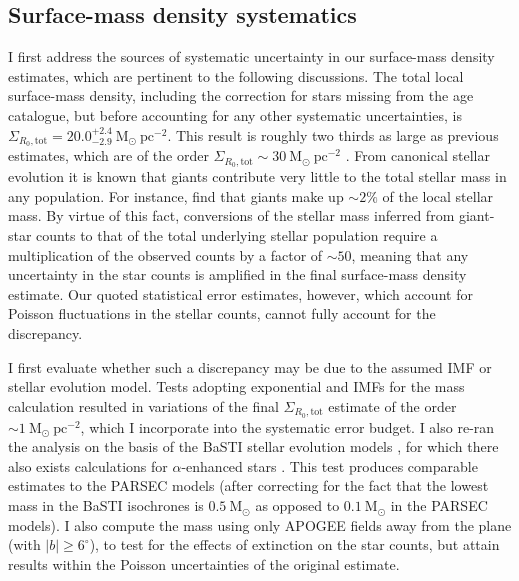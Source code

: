 \subsection{Surface-mass density systematics}
\label{sec:discrepant}
I first address the sources of systematic uncertainty in our surface-mass density estimates, which are pertinent to the following discussions. The total local surface-mass density, including the correction for stars missing from the age catalogue, but before accounting for any other systematic uncertainties, is $\Sigma_{R_0, \text{tot}} = 20.0_{-2.9}^{+2.4}\ \mathrm{M_{\odot} \ pc^{-2}}$. This result is roughly two thirds as large as previous estimates, which are of the order $\Sigma_{R_0, \text{tot}} \sim 30\ \mathrm{M_{\odot} \ pc^{-2}}$ \citep[e.g.][]{2006MNRAS.372.1149F,2012ApJ...751..131B,2015ApJ...814...13M}. From canonical stellar evolution it is known that giants contribute very little to the total stellar mass in any population. For instance, \citet{2015ApJ...814...13M} find that giants make up $\sim 2\%$ of the local stellar mass. By virtue of this fact, conversions of the stellar mass inferred from giant-star counts to that of the total underlying stellar population require a multiplication of the observed counts by a factor of $\sim 50$, meaning that any uncertainty in the star counts is amplified in the final surface-mass density estimate. Our quoted statistical error estimates, however, which account for Poisson fluctuations in the stellar counts, cannot fully account for the discrepancy. 

I first evaluate whether such a discrepancy may be due to the assumed IMF or stellar evolution model. Tests adopting exponential \citet{2003PASP..115..763C} and \citet{2001MNRAS.322..231K} IMFs for the mass calculation resulted in variations of the final $\Sigma_{R_0, \text{tot}}$ estimate of the order $\sim 1\ \mathrm{M_{\odot}\ pc^{-2}}$, which I incorporate into the systematic error budget. I also re-ran the analysis on the basis of the BaSTI stellar evolution models \citep{2004ApJ...612..168P}, for which there also exists calculations for $\alpha$-enhanced stars \citep{2006ApJ...642..797P}. This test produces comparable estimates to the PARSEC models (after correcting for the fact that the lowest mass in the BaSTI isochrones is $0.5\  \mathrm{M_{\odot}}$ as opposed to $0.1\ \mathrm{M_{\odot}}$ in the PARSEC models). I also compute the mass using only APOGEE fields away from the plane (with $|b|\geq 6^{\circ}$), to test for the effects of extinction on the star counts, but attain results within the Poisson uncertainties of the original estimate.

